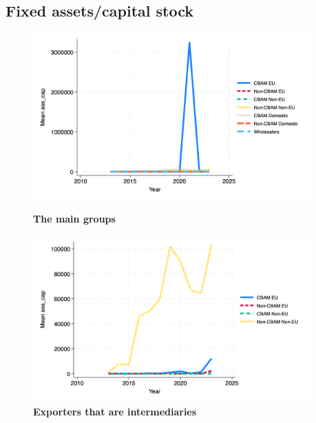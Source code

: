\documentclass{article}
\begin{document}
\subsection{Fixed assets/capital stock}
\begin{figure}[H]
\centering
\includegraphics[width=0.95\textwidth]{ass_cap_main_groups.png}
\caption{\textbf{The main groups}}
\includegraphics[width=0.95\textwidth]{ass_cap_ei.png}
\caption{\textbf{Exporters that are intermediaries}}
\end{figure}
\end{document}

